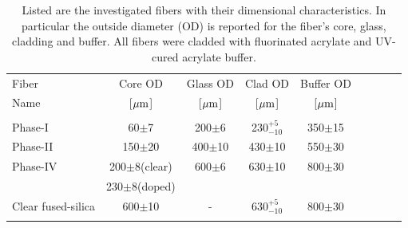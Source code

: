 \documentclass[a4paper,11pt]{article}
\begin{document}
\begin{table}[htp]
\caption{\small Listed are the investigated fibers with their dimensional characteristics. In particular the outside diameter (OD) is reported for the fiber's core, glass, cladding and buffer. All fibers were cladded with fluorinated acrylate and UV-cured acrylate buffer.}
\vspace{-2 mm}
\begin{center}
{\small
\begin{tabular}{|l|c|c|c|c|c|c|c|c|} \hline
Fiber              &  Core OD            & Glass OD        & Clad OD          & Buffer  OD        \\
Name               &[${\rm \mu m}$]      & [${\rm \mu m}$] & [${\rm \mu m}$]  & [${\rm \mu m}$]   \\
\hline
                    &                     &                &                  & \\
Phase-I            & 60$\pm$7            &	200$\pm$6      & 230$^{+5}_{-10}$ &	350$\pm$15        \\
Phase-II           & 150$\pm$20		     &	400$\pm$10     & 430$\pm$10	      &	550$\pm$30        \\
Phase-IV           & 200$\pm$8(clear)   &	600$\pm$6	   & 630$\pm$10       &	800$\pm$30        \\
                          & 230$\pm$8(doped) &	   &     &	         \\
Clear fused-silica & 600$\pm$10          &-				   & 630$^{+5}_{-10}$ &	800$\pm$30	      \\
                    &                     &                &                  & \\
\hline
\end{tabular}
}
\end{center}
\label{tab:fiberlist}
\end{table}
\end{document}
